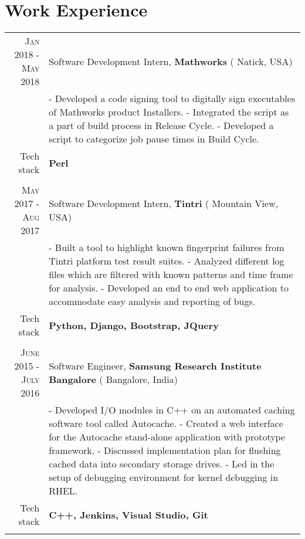 \section {Work Experience}
\renewcommand{\arraystretch}{0.95}%
\begin{tabular}{r|p{14cm}}

\textsc {Jan 2018 - May 2018} & Software Development Intern, \textbf{Mathworks} ( Natick, USA)\\
& \small{
- Developed a code signing tool to digitally sign executables of Mathworks product Installers. \newline
- Integrated the script as a part of build process in Release Cycle.\newline
- Developed a script to categorize job pause times in Build Cycle.} \\
\small{Tech stack} &\footnotesize{\textbf{Perl}} \\
\multicolumn{2}{c}{} \\

\textsc {May 2017 - Aug 2017} & Software Development Intern, \textbf{Tintri} ( Mountain View, USA)\\
& \small{
- Built a tool to highlight known fingerprint failures from Tintri platform test result suites. \newline
- Analyzed different log files which are filtered with known patterns and time frame for analysis.\newline
- Developed an end to end web application to accommodate easy analysis and reporting of bugs.} \\
\small{Tech stack} &\footnotesize{\textbf{Python, Django, Bootstrap, JQuery}} \\
\multicolumn{2}{c}{} \\

\textsc {June 2015 - July 2016} & Software Engineer, \textbf{Samsung Research Institute Bangalore} ( Bangalore, India) \\
& \small{
- Developed I/O modules in C++ on an automated caching software tool called Autocache.\newline
- Created a web interface for the Autocache stand-alone application with prototype framework.\newline
- Discussed implementation plan for flushing cached data into secondary storage drives.\newline
- Led in the setup of debugging environment for kernel debugging in RHEL.}\\
\small{Tech stack} &\footnotesize{\textbf{C++, Jenkins, Visual Studio, Git}} \\
\multicolumn{2}{c}{} \\



\end{tabular}
